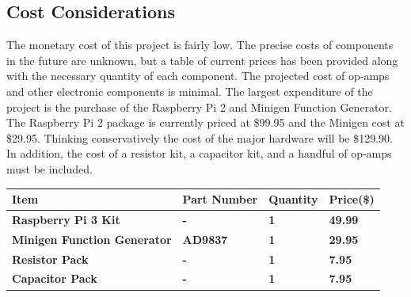\documentclass{article}	%
\begin{document}
\begin{multicols}{2}
\section{Cost Considerations}
The monetary cost of this project is fairly low. 
The precise costs of components in the future are unknown, but
a table 
of current prices has been provided
along with the necessary quantity of each component.
The projected cost of op-amps and other electronic components is minimal. 
The largest expenditure of the project is
the purchase of the 
Raspberry Pi 2 and 
Minigen Function Generator. 
The Raspberry Pi 2 package is currently priced at \$99.95 and
the Minigen cost at \$29.95.
Thinking conservatively the cost of the major hardware will be \$129.90. 
In addition, the cost of 
a resistor kit, 
a capacitor kit, and 
a handful of op-amps 
must be included.


\begin{center}
    \begin{tabularx}{0.4\textwidth}{|X|X|X|X|}
        \hline

        \textbf{Item} &
        \textbf{Part Number} &
        \textbf{Quantity} &
        \textbf{Price(\$)} \\
        \hline

        \textbf{Raspberry Pi 3 Kit} &
        \textbf{-} &
        \textbf{1} &
        \textbf{49.99} \\
        \hline

        \textbf{Minigen Function Generator} &
        \textbf{AD9837} &
        \textbf{1} &
        \textbf{29.95} \\
        \hline

        \textbf{Resistor Pack} &
        \textbf{-} &
        \textbf{1} &
        \textbf{7.95} \\
        \hline

        \textbf{Capacitor Pack} &
        \textbf{-} &
        \textbf{1} &
        \textbf{7.95} \\
        \hline


\end{tabularx}
\end{center}
\end{multicols}
\end{document}
